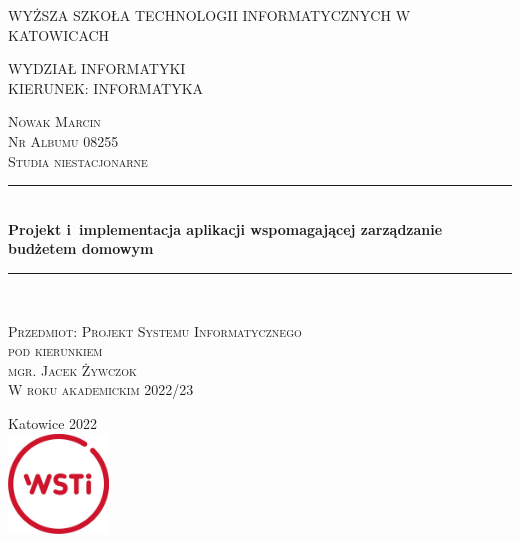 \documentclass[a4paper,10pt, twoside]{report}
\newcommand{\customstyletitle}[1]{\Huge{\textbf{#1}}}
\newcommand{\HRule}{\rule{\linewidth}{0.5mm}} %
\begin{document}
\begin{titlepage}
	\begin{center}
    \begin{onehalfspace}
    \textsc{\LARGE{WYŻSZA SZKOŁA TECHNOLOGII INFORMATYCZNYCH W KATOWICACH}}\\
    \end{onehalfspace}
    \textsc{\large{WYDZIAŁ INFORMATYKI}}\\
	\textsc{\large{KIERUNEK: INFORMATYKA}}\\
    \end{center}
    
	\begin{flushleft}
    \textsc{Nowak Marcin}\\[0cm]
    \textsc{Nr Albumu 08255}\\[0cm]
    \textsc{Studia niestacjonarne}\\[0cm]
    \end{flushleft}
	
	\begin{center}
    \HRule\\[0.4cm]
	{\customstyletitle{Projekt i implementacja aplikacji wspomagającej zarządzanie budżetem domowym}}\\[0.4cm] 
    \HRule\\[1.5cm]
    \end{center}
	
	\begin{flushright}
        \textsc{Przedmiot: Projekt Systemu Informatycznego}\\[0cm]
        \textsc{pod kierunkiem}\\[0cm]
        \textsc{mgr. Jacek Żywczok}\\[0cm]
        \textsc{W roku akademickim 2022/23}\\[0cm]
    \end{flushright}
 
	\vfill                  %
	\begin{center}
    {Katowice 2022}\\	    %
	\includegraphics[width=0.2\textwidth]{figures/WSTI-logo.jpg}\\[1cm]
	\end{center}
\end{titlepage}
\end{document}

